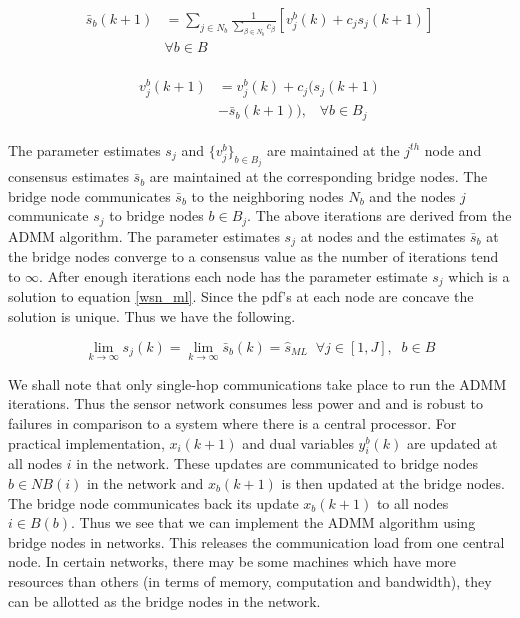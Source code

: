 \documentclass[letterpaper, 10 pt, conference]{ieeeconf}  %
\begin{document}
\begin{align}
\begin{split}
\bar{s}_b(k+1) 
& = \sum_{j \in N_b} \frac{1}{\sum_{\beta \in N_b} c_{\beta}} [v_{j}^{b}(k) + c_j s_j (k+1)]  \\
& \forall b \in B
\end{split}
\end{align}

\begin{align}
\begin{split}
v_j^b(k+1) 
& = v_j^b(k) + c_j (s_j(k+1) \\
& - \bar{s}_b (k+1)), \;\;\; \forall b \in B_j
\end{split}
\end{align}

The parameter estimates $s_j$ and $\{ v_j^b \}_{b \in B_j}$ are maintained at the $j^{th}$ node and consensus estimates $\bar{s}_b$ are maintained at the corresponding bridge nodes. The bridge node communicates $\bar{s}_b$ to the neighboring nodes $N_b$ and the nodes $j$ communicate $s_j$ to bridge nodes $b \in B_j$. The above iterations are derived from the ADMM algorithm. The parameter estimates $s_j$ at nodes and the estimates $\bar{s}_b$ at the bridge nodes converge to a consensus value as the number of iterations tend to $\infty$. After enough iterations each node has the parameter estimate $s_j$ which is a solution to equation \ref{wsn_ml}. Since the pdf's at each node are concave the solution is unique. Thus we have the following.

\begin{equation}
\lim_{k \rightarrow \infty} s_j(k) = \lim_{k \rightarrow \infty} \bar{s}_b(k) = \hat{s}_{ML} \;\; \forall j \in [1,J], \;\; b \in B
\end{equation}

We shall note that only single-hop communications take place to run the ADMM iterations. Thus the sensor network consumes less power and and is robust to failures in comparison to a system where there is a central processor.  For practical implementation, $x_i(k+1)$ and dual variables $y_{i}^{b}(k)$ are updated at all nodes $i$ in the network. These updates are communicated to bridge nodes $b \in NB(i)$ in the network and $x_b(k+1)$ is then updated at the bridge nodes. The bridge node communicates back its update $x_b(k+1)$ to all nodes $i \in B(b)$. Thus we see that we can implement the ADMM algorithm using bridge nodes in networks. This releases the communication load from one central node. In certain networks, there may be some machines which have more resources than others (in terms of memory, computation and bandwidth), they can be allotted as the bridge nodes in the network.
\end{document}
